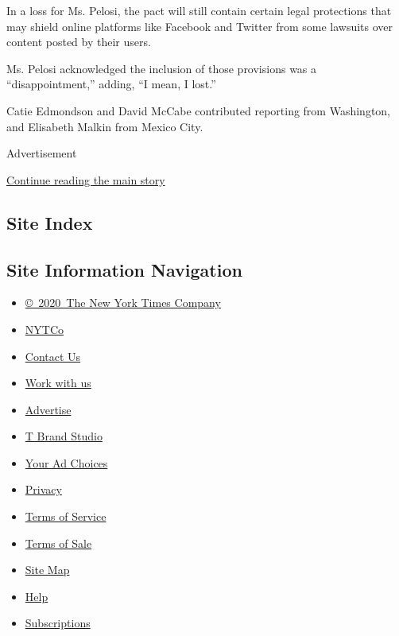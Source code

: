 In a loss for Ms. Pelosi, the pact will still contain certain legal
protections that may shield online platforms like Facebook and Twitter
from some lawsuits over content posted by their users.

Ms. Pelosi acknowledged the inclusion of those provisions was a
``disappointment,'' adding, ``I mean, I lost.''

Catie Edmondson and David McCabe contributed reporting from Washington,
and Elisabeth Malkin from Mexico City.

Advertisement

\protect\hyperlink{after-bottom}{Continue reading the main story}

\hypertarget{site-index}{%
\subsection{Site Index}\label{site-index}}

\hypertarget{site-information-navigation}{%
\subsection{Site Information
Navigation}\label{site-information-navigation}}

\begin{itemize}
\tightlist
\item
  \href{https://help.nytimes.com/hc/en-us/articles/115014792127-Copyright-notice}{©~2020~The
  New York Times Company}
\end{itemize}

\begin{itemize}
\tightlist
\item
  \href{https://www.nytco.com/}{NYTCo}
\item
  \href{https://help.nytimes.com/hc/en-us/articles/115015385887-Contact-Us}{Contact
  Us}
\item
  \href{https://www.nytco.com/careers/}{Work with us}
\item
  \href{https://nytmediakit.com/}{Advertise}
\item
  \href{http://www.tbrandstudio.com/}{T Brand Studio}
\item
  \href{https://www.nytimes.com/privacy/cookie-policy\#how-do-i-manage-trackers}{Your
  Ad Choices}
\item
  \href{https://www.nytimes.com/privacy}{Privacy}
\item
  \href{https://help.nytimes.com/hc/en-us/articles/115014893428-Terms-of-service}{Terms
  of Service}
\item
  \href{https://help.nytimes.com/hc/en-us/articles/115014893968-Terms-of-sale}{Terms
  of Sale}
\item
  \href{https://spiderbites.nytimes.com}{Site Map}
\item
  \href{https://help.nytimes.com/hc/en-us}{Help}
\item
  \href{https://www.nytimes.com/subscription?campaignId=37WXW}{Subscriptions}
\end{itemize}

